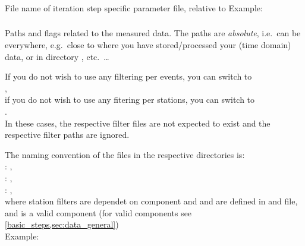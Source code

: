 \subsubsection{} \label{files,sec:main_parfile,itm:iter_parfile}
File name of iteration step specific parameter file, relative to 
Example: 
\subsubsection{} 
\label{files,sec:main_parfile,itm:path_mdata_filters}
Paths and flags related to the measured data. The paths are \emph{absolute}, i.e.\ can be everywhere, 
e.g.\ close to where you 
have stored/processed your (time domain) data, or in directory , etc.\ \dots

If you do not wish to use any filtering per events, you can switch to\\
,\\
if you do not wish to use any fitering per stations, you can switch to\\
.\\
In these cases, the respective filter files are not expected to exist and the respective filter paths are
ignored.

The naming convention of the files in the respective directories is:\\
: ,\\
: ,\\
: , \\
where station filters are dependet on component and  and  are 
defined in  and  file, and  
is a valid component (for valid components see \ref{basic_steps,sec:data_general})\\
Example: \\
\\
\\
\\

